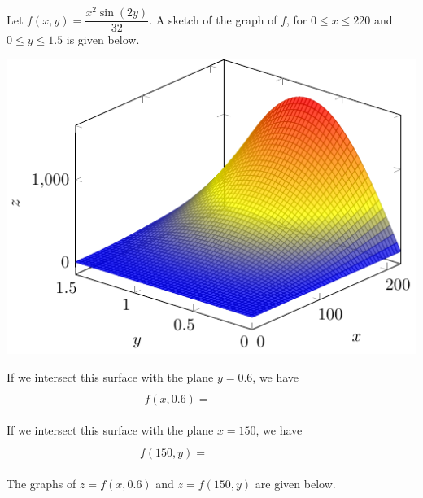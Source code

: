 \begin{example}
    Let $f(x,y)=\dfrac{x^2\sin(2y)}{32}$. A sketch of the graph of $f$, for $0\le x\le 220$ and $0\le y\le 1.5$ is given below.

    {\centering 
    \includegraphics[scale=1]{tikz-pictures/section-9.1-again-pic1-3d-graph-with-traces-1.pdf}\label{img:next-3d-graph}
    \par} 

    \noindent If we intersect this surface with the plane $y=0.6$, we have 
    \[f(x,0.6)=\phantom{\dfrac{x^2\sin(1.2)}{32}}\]
    
    \noindent If we intersect this surface with the plane $x=150$, we have 
    \[f(150,y)=\phantom{\dfrac{150^2\sin(2y)}{32}}\]
    
    The graphs of $z=f(x,0.6)$ and $z=f(150,y)$ are given below.
    
    \pagebreak 
    \mbox{}
    \bigskip 
    

\end{example}
